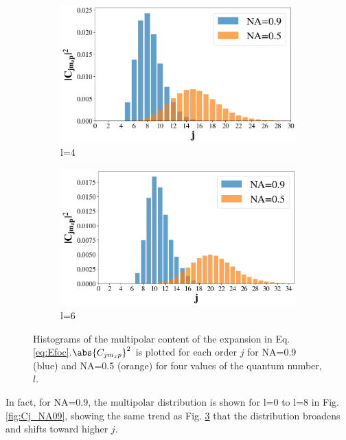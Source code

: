 \begin{figure}[htbp]
    \begin{subfigure}[b]{0.49\textwidth}
        \centering
        \includegraphics[width=\textwidth]{Figures/contentl4.png} %
        \caption{l=4}
        \label{fig:cc}
    \end{subfigure}
    \hfill
    \begin{subfigure}[b]{0.49\textwidth}
        \centering
        \includegraphics[width=\textwidth]{Figures/contentl6.png} %
        \caption{l=6}
        \label{fig:dd}
    \end{subfigure}

    \caption{Histograms of the multipolar content of the expansion in Eq. \ref{eq:Efoc}.$  \abs{C_{jm_zp}}^2$ is plotted for each order $j$ for NA=0.9 (blue) and NA=0.5 (orange) for four values of the quantum number, $l$.}
    \label{fig:mcontent}
\end{figure}
In fact, for NA=0.9, the multipolar distribution is shown for l=0 to l=8 in Fig. \ref{fig:Cj_NA09}, showing the same trend as Fig. \ref{fig:mcontent} that the distribution broadens and shifts toward higher $j$.
